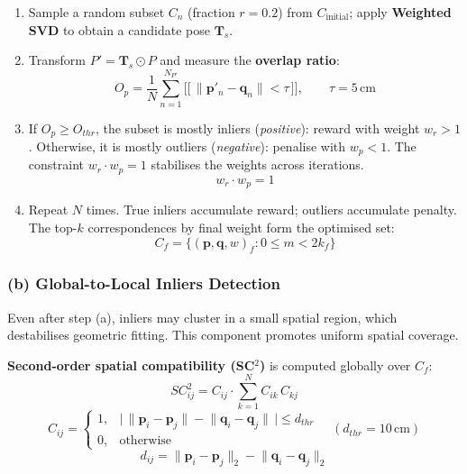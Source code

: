 \documentclass[11pt,a4paper]{article}
\begin{document}
\begin{enumerate}[noitemsep]
  \item Sample a random subset $C_n$ (fraction $r=0.2$) from $C_{\text{initial}}$;
    apply \textbf{Weighted SVD} to obtain a candidate pose $\mathbf{T}_s$.
  \item Transform $P' = \mathbf{T}_s \odot P$ and measure the \textbf{overlap ratio}:
    \begin{equation}
      O_p = \frac{1}{N}\sum_{n=1}^{N_{P'}}
      \bigl[\!\bigl[\,\lVert \mathbf{p}'_n - \mathbf{q}_n\rVert < \tau\,\bigr]\!\bigr],
      \qquad \tau = 5\,\text{cm}
      \tag{6}
    \end{equation}
  \item If $O_p \ge O_{thr}$, the subset is mostly inliers (\emph{positive}): reward with
    weight $w_r > 1$.  Otherwise, it is mostly outliers (\emph{negative}): penalise with
    $w_p < 1$.  The constraint $w_r \cdot w_p = 1$ stabilises the weights across
    iterations.
    \begin{equation}
      w_r \cdot w_p = 1
      \tag{7}
    \end{equation}
  \item Repeat $N$ times. True inliers accumulate reward; outliers accumulate penalty.
    The top-$k$ correspondences by final weight form the optimised set:
    \begin{equation}
      C_f = \bigl\{(\mathbf{p}, \mathbf{q}, w)_f : 0 \le m < 2k_f\bigr\}
      \tag{8}
    \end{equation}
\end{enumerate}

\subsubsection{(b) Global-to-Local Inliers Detection}

Even after step (a), inliers may cluster in a small spatial region, which destabilises
geometric fitting. This component promotes uniform spatial coverage.

\textbf{Second-order spatial compatibility (SC$^2$)} is computed globally over $C_f$:
\begin{equation}
  SC^2_{ij} = C_{ij}\cdot \sum_{k=1}^{N} C_{ik}\,C_{kj}
  \tag{9}
\end{equation}
\begin{equation}
  C_{ij} =
  \begin{cases}
    1, & \bigl|\,\lVert\mathbf{p}_i-\mathbf{p}_j\rVert
         - \lVert\mathbf{q}_i-\mathbf{q}_j\rVert\,\bigr| \le d_{thr}\\
    0, & \text{otherwise}
  \end{cases}
  \quad (d_{thr} = 10\,\text{cm})
  \tag{10}
\end{equation}
\begin{equation}
  d_{ij} = \lVert\mathbf{p}_i - \mathbf{p}_j\rVert_2 - \lVert\mathbf{q}_i - \mathbf{q}_j\rVert_2
  \tag{11}
\end{equation}
\end{document}
